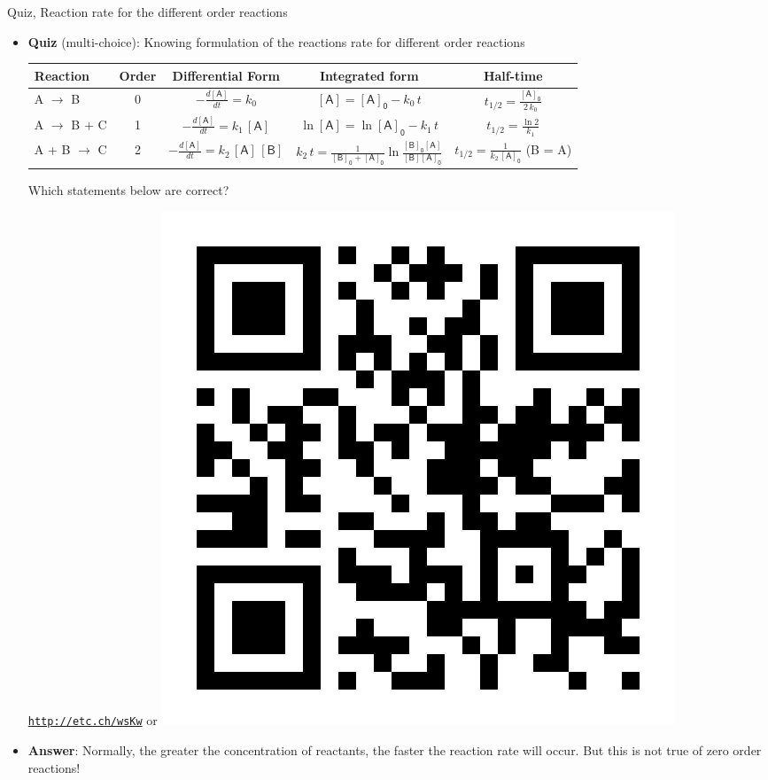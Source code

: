 \begin{frame}{Quiz, Reaction rate for the different order reactions}
	\begin{itemize}
		\item \alert{\bf Quiz} (multi-choice): Knowing formulation of the reactions rate for different order reactions
		
		\begin{table}
\footnotesize
	\begin{tabular*}{1\textwidth}{@{\extracolsep{\fill}}lcccc}
		\toprule 
		Reaction & Order & Differential Form & Integrated form & Half-time \\[5pt]
		\midrule 
		A $\rightarrow$ B & 0 & $-\tfrac{d \mathsf{[A]}}{dt} = k_0$ & $\mathsf{[A]} = \mathsf{[A]_0} - k_0\,t$ & 
		$t_{1/2} = \tfrac{\mathsf{[A]_0}}{2\,k_0}$ \\[5pt]
		A $\rightarrow$ B + C & 1 & $-\tfrac{d \mathsf{[A]}}{dt} = k_1\, \mathsf{[A]}$ & $\ln \mathsf{[A]} = \ln \mathsf{[A]_0} - k_1\,t$ & $t_{1/2} = \tfrac{\ln 2}{k_1}$ \\[5pt]
		A + B  $\rightarrow$ C & 2 & $-\tfrac{d \mathsf{[A]}}{dt} = k_2\, \mathsf{[A]}\, \mathsf{[B]}$ & 
		$k_2\,t = \tfrac{1}{\mathsf{[B]_0} + \mathsf{[A]_0}} \ln \tfrac{\mathsf{[B]_0} \mathsf{[A]}}{\mathsf{[B]} \mathsf{[A]_0}}$ & $t_{1/2} = \tfrac{1}{k_2 \, \mathsf{[A]_0}}$ (B = A) \\[5pt]
		\bottomrule
	\end{tabular*}
\end{table}
		\vskip 10pt
		Which statements below are correct?
		\begin{center}
			\href{http://etc.ch/wsKw}{\textcolor{indigo(dye)}{\tt http://etc.ch/wsKw}} 
			\quad or \quad  
			\includegraphics[height=0.1\columnwidth]{figures/chemical-kinetics/polls.png}
		\end{center}
		\hiddenpause 
		\vskip 10pt
		\item {\bf Answer}: Normally, the greater the concentration of reactants, the faster the reaction rate will occur. But this is not true of zero order reactions! 
	\end{itemize}
\end{frame}
